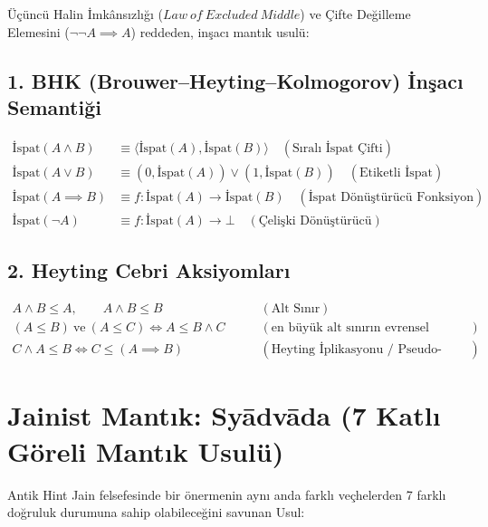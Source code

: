 \documentclass[11pt, a4paper]{article}
\begin{document}
Üçüncü Halin İmkânsızlığı ($Law\ of\ Excluded\ Middle$) ve Çifte Değilleme Elemesini ($\neg\neg A \implies A$) reddeden, inşacı mantık usulü:

\subsection{1. BHK (Brouwer--Heyting--Kolmogorov) İnşacı Semantiği}
\begin{align}
\text{İspat}(A \land B) &\equiv \langle \text{İspat}(A), \text{İspat}(B) \rangle \quad (\text{Sıralı İspat Çifti}) \\
\text{İspat}(A \lor B) &\equiv (0, \text{İspat}(A)) \lor (1, \text{İspat}(B)) \quad (\text{Etiketli İspat}) \\
\text{İspat}(A \implies B) &\equiv f : \text{İspat}(A) \longrightarrow \text{İspat}(B) \quad (\text{İspat Dönüştürücü Fonksiyon}) \\
\text{İspat}(\neg A) &\equiv f : \text{İspat}(A) \longrightarrow \bot \quad (\text{Çelişki Dönüştürücü})
\end{align}

\subsection{2. Heyting Cebri Aksiyomları}
\begin{align}
A \land B \le A, \qquad A \land B \le B \qquad &(\text{Alt Sınır}) \\
(A \le B) \ \text{ve} \ (A \le C) \iff A \le B \land C \qquad &(\text{en büyük alt sınırın evrensel hususiyeti}) \\
C \land A \le B \iff C \le (A \implies B) \qquad &(\text{Heyting İplikasyonu / Pseudo-Complement})
\end{align}

\section{Jainist Mantık: Syādvāda (7 Katlı Göreli Mantık Usulü)}

Antik Hint Jain felsefesinde bir önermenin aynı anda farklı veçhelerden 7 farklı doğruluk durumuna sahip olabileceğini savunan Usul:
\end{document}
